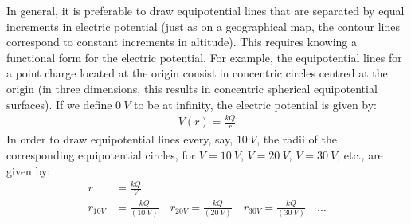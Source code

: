 

In general, it is preferable to draw equipotential lines that are separated by equal increments in electric potential (just as on a geographical map, the contour lines correspond to constant increments in altitude). This requires knowing a functional form for the electric potential. For example, the equipotential lines for a point charge located at the origin consist in concentric circles centred at the origin (in three dimensions, this results in concentric spherical equipotential surfaces). If we define $\SI{0}{V}$ to be at infinity, the electric potential is given by:
\begin{align*}
V(r)=\frac{kQ}{r}
\end{align*}
In order to draw equipotential lines every, say, $\SI{10}{V}$, the radii of the corresponding equipotential circles, for $V=\SI{10}{V}$, $V=\SI{20}{V}$, $V=\SI{30}{V}$, etc., are given by:
\begin{align*}
r&=\frac{kQ}{V}\\
r_{10V}&=\frac{kQ}{(\SI{10}{V})}\quad r_{20V}=\frac{kQ}{(\SI{20}{V})}\quad r_{30V}=\frac{kQ}{(\SI{30}{V})}\quad \dots
\end{align*}

